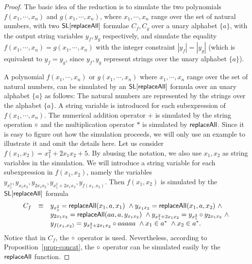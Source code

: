 \begin{proof}
The basic idea of the reduction is to simulate the two polynomials $f(x_1,\cdots, x_n)$ and $g(x_1,\cdots, x_n)$, where $x_1,\cdots,x_n$ range over the set of natural numbers, with two $\mathsf{SL}[\mathsf{replaceAll}]$ formulae $C_f, C_g$ over a unary alphabet $\{a\}$, with the output string variables $y_f, y_g$ respectively, and simulate the equality $f(x_1,\cdots, x_n) = g(x_1,\cdots, x_n)$ with the integer constraint $|y_f|=|y_g|$ (which is equivalent to $y_f = y_g$, since $y_f, y_g$ represent strings over the unary alphabet $\{a\}$).

A polynomial $f(x_1,\cdots, x_n)$ or $g(x_1,\cdots, x_n)$ where $x_1, \cdots, x_n$ range over the set of natural numbers, can be simulated by an $\mathsf{SL}[\mathsf{replaceAll}]$ formula over an unary alphabet $\{a\}$ as follows: The natural numbers are represented by the strings over the alphabet $\{a\}$. A string variable is introduced for each subexpression of $f(x_1,\cdots, x_n)$. The numerical addition operator $+$ is simulated by the string operation $\circ$
and the multiplication operator $*$ is simulated by $\mathsf{replaceAll}$. Since it is easy to figure out how the simulation proceeds, we will only use an example to illustrate it and omit the details here. Let us consider $f(x_1,x_2) = x_1^2 + 2 x_1 x_2 + 5$. By abusing the notation, we also use $x_1,x_2$ as string variables in the simulation. We will introduce a string variable for each subexpression in $f(x_1,x_2)$, namely the variables $y_{x_1^2}, y_{x_1x_2}, y_{2x_1x_2}, y_{x_1^2+2x_1x_2}, y_{f(x_1,x_2)}$. Then $f(x_1,x_2)$ is simulated by the $\mathsf{SL}[\mathsf{replaceAll}]$ formula
\[
\begin{array} {l c l }
C_f & \equiv & y_{x_1^2} = \mathsf{replaceAll}(x_1,a, x_1)\ \wedge y_{x_1x_2} = \mathsf{replaceAll}(x_1, a, x_2)\ \wedge \\
& & y_{2x_1x_2} = \mathsf{replaceAll}(aa, a, y_{x_1x_2})\ \wedge y_{x_1^2+2x_1x_2} = y_{x_1^2} \circ y_{2x_1x_2}\ \wedge  \\
& & y_{f(x_1,x_2)}=y_{x_1^2+2x_1x_2} \circ a a a a a\ \wedge x_1 \in a^*\ \wedge x_2 \in a^*.
\end{array}
\]
Notice that in $C_f$, the $\circ$ operator is used. Nevertheless, according to Proposition~\ref{prop-concat}, the $\circ$ operator can be simulated easily by the $\mathsf{replaceAll}$ function.
 

\end{proof}
